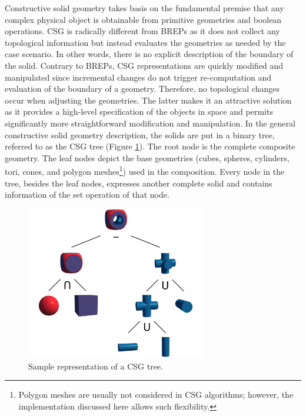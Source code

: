\documentclass[a4paper,11pt,oneside]{article}
\begin{document}
Constructive solid geometry takes basis on the fundamental premise that any complex physical object is obtainable from primitive geometries and boolean operations. CSG is radically different from BREPs as it does not collect any topological information but instead evaluates the geometries as needed by the case scenario. In other words, there is no explicit description of the boundary of the solid. Contrary to BREPs,  CSG representations are quickly modified and manipulated since incremental changes do not trigger re-computation and evaluation of the boundary of a geometry. Therefore, no topological changes occur when adjusting the geometries. The latter makes it an attractive solution as it provides a high-level specification of the objects in space and permits significantly more straightforward modification and manipulation. In the general constructive solid geometry description, the solids are put in a binary tree, referred to as the CSG tree (Figure \ref{sec3.1:sample-csg-tree}). The root node is the complete composite geometry. The leaf nodes depict the base geometries (cubes, spheres, cylinders, tori, cones, and polygon meshes\footnote{Polygon meshes are usually not considered in CSG algorithms; however, the implementation discussed here allows such flexibility.}) used in the composition. Every node in the tree, besides the leaf nodes, expresses another complete solid and contains information of the set operation of that node.

\begin{figure}[ht]
	\begin{center}
		\includegraphics[width=0.7\textwidth]{section1/sample-csg-tree.png}
	\end{center}
	\caption{Sample representation of a CSG tree.}
	\label{sec3.1:sample-csg-tree}
\end{figure}
  
\end{document}
